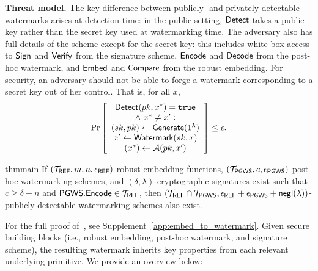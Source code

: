 \documentclass[12pt]{article}
\begin{document}
\textbf{Threat model.}
The key difference between publicly- and privately-detectable watermarks arises at detection time: in the public setting, $\mathsf{Detect}$ takes a public key rather than the secret key used at watermarking time.
The adversary also has full details of the scheme except for the secret key: this includes white-box access to $\mathsf{Sign}$ and $\mathsf{Verify}$ from the signature scheme, $\mathsf{Encode}$ and $\mathsf{Decode}$ from the post-hoc watermark, and $\mathsf{Embed}$ and $\mathsf{Compare}$ from the robust embedding.
For security, an adversary should not be able to forge a watermark corresponding to a secret key out of her control. That is, for all $x$,
\begin{align*}
    \Pr\left[
    \begin{array}{ccc}
        \begin{matrix}
            \mathsf{Detect}(pk, x^*) = \mathtt{true} \\
            \land\ x^* \neq x': \\
            (sk, pk) \gets \mathsf{Generate}(1^\lambda) \\
            x' \gets \mathsf{Watermark}(sk, x) \\
            (x^*) \gets \mathcal{A}(pk, x') \\
        \end{matrix} \\
    \end{array}
    \right] \leq \epsilon.
\end{align*}

\begin{restatable}{thm}{main}\label{thm:ref_to_rpws}
If $(\mathcal{T}_{\mathsf{REF}}, m, n, \epsilon_{\mathsf{REF}})$-robust embedding functions, $(\mathcal{T}_{\mathsf{PGWS}}, c, \epsilon_{\mathsf{PGWS}})$-post-hoc watermarking schemes, and $(\delta, \lambda)$-cryptographic signatures exist such that $c \geq \delta + n$ and $\mathsf{PGWS}.\mathsf{Encode} \in \mathcal{T}_{\mathsf{REF}}$, then $(\mathcal{T}_{\mathsf{REF}} \cap \mathcal{T}_{\mathsf{PGWS}}, \epsilon_{\mathsf{REF}} + \epsilon_{\mathsf{PGWS}} + \mathsf{negl}(\lambda))$-publicly-detectable watermarking schemes also exist.
\end{restatable}
For the full proof of~, see Supplement~\ref{app:embed_to_watermark}.
Given secure building blocks (i.e., robust embedding, post-hoc watermark, and signature scheme), the resulting watermark inherits key properties from each relevant underlying primitive.
We provide an overview below:
\end{document}
